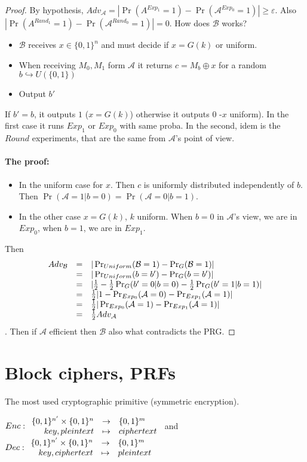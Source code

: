\documentclass{article}
\newcommand{\A}{\mathcal{A}}
\newcommand{\B}{\mathcal{B}}
\newcommand{\half}{\frac{1}{2}}
\newcommand{\bit}{\{0,1\}}
\renewcommand{\epsilon}{\varepsilon}
\begin{document}
\begin{proof}
By hypothesis, $Adv_\A=|\Pr(A^{Exp_1}=1)-\Pr(\A^{Exp_0}=1)|\geq\epsilon$. Also $|\Pr(A^{Rand_1}=1)-\Pr(\A^{Rand_0}=1)|=0$. How does $\mathcal{B}$ works?
\begin{itemize}
\item $\mathcal{B}$ receives $x\in\{0,1\}^n$ and must decide if $x=G(k)$ or uniform.
\item When receiving $M_0,M_1$ form $\A$ it returns $c=M_b\oplus x$ for a random $b\hookrightarrow U(\{0,1\})$
\item Output $b'$
\end{itemize}
If $b'=b$, it outputs $1$ ($x=G(k)$) otherwise it outputs $0$ -$x$ uniform). In the first case it runs $Exp_1$ or $Exp_0$ with same proba. In the second, idem is the $Round$ experiments, that are the same from $\A$'s point of view.

\paragraph{The proof:} 
\begin{itemize}
\item In the uniform case for $x$. Then $c$ is uniformly distributed independently of $b$. Then $\Pr(\A=1|b=0)=\Pr(\A=0|b=1)$.
\item In the other case $x=G(k)$, $k$ uniform. When $b=0$ in $\A$'s view, we are in $Exp_0$, when $b=1$, we are in $Exp_1$.
\end{itemize}
Then \[\begin{array}{r c l}
Adv_\B &=&|\Pr_{Uniform}(\B=1)-\Pr_{G}(\B=1)|\\
&=& |\Pr_{Uniform}(b=b')-\Pr_{G}(b=b')|\\
&=& |\half-\half\Pr_G(b'=0|b=0)-\half\Pr_G(b'=1|b=1)|\\
&=& \half |1-\Pr_{Exp_0}(\A=0)-\Pr_{Exp_1}(\A=1)|\\
&=& \half |\Pr_{Exp_0}(\A=1)-\Pr_{Exp_1}(\A=1)|\\
&=& \half Adv_\A
\end{array}\].
Then if $\A$ efficient then $\B$ also what contradicts the PRG.
\end{proof}

\section{Block ciphers, PRFs}
The most used cryptographic primitive (symmetric encryption).

$Enc:\begin{array}{r c l}
\bit^{n'}\times\bit^n &\rightarrow&\bit^m\\
key,pleintext&\mapsto&ciphertext
\end{array}$ and $Dec:\begin{array}{r c l}
\bit^{n'}\times\bit^n &\rightarrow&\bit^m\\
key,ciphertext&\mapsto&pleintext
\end{array}$
\end{document}
